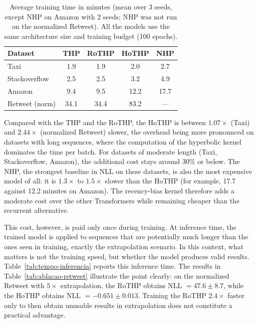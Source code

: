 \begin{table}[h!]
\centering
\caption{Average training time in minutes (mean over 3 seeds, except NHP on Amazon with 2 seeds; NHP was not run on the normalized Retweet). All the models use the same architecture size and training budget (100 epochs).}
\label{tab:tempo-treino}
\begin{tabular}{lcccc}
\toprule
Dataset & THP & RoTHP & HoTHP & NHP \\
\midrule
Taxi           &  1.9 &  1.9 &  2.0 &  2.7 \\
Stackoverflow  &  2.5 &  2.5 &  3.2 &  4.9 \\
Amazon         &  9.4 &  9.5 & 12.2 & 17.7 \\
Retweet (norm) & 34.1 & 34.4 & 83.2 & --- \\
\bottomrule
\end{tabular}
\end{table}

Compared with the THP and the RoTHP, the HoTHP is between $1.07\times$ (Taxi) and $2.44\times$ (normalized Retweet) slower, the overhead being more pronounced on datasets with long sequences, where the computation of the hyperbolic kernel dominates the time per batch. For datasets of moderate length (Taxi, Stackoverflow, Amazon), the additional cost stays around $30\%$ or below. The NHP, the strongest baseline in NLL on these datasets, is also the most expensive model of all: it is $1.3\times$ to $1.5\times$ slower than the HoTHP (for example, 17.7 against 12.2 minutes on Amazon). The recency-bias kernel therefore adds a moderate cost over the other Transformers while remaining cheaper than the recurrent alternative.

This cost, however, is paid only once during training. At inference time, the trained model is applied to sequences that are potentially much longer than the ones seen in training, exactly the extrapolation scenario. In this context, what matters is not the training speed, but whether the model produces valid results. Table~\ref{tab:tempo-inferencia} reports this inference time. The results in Table~\ref{tab:ablacao-retweet} illustrate the point clearly: on the normalized Retweet with $5\times$ extrapolation, the RoTHP obtains NLL $= 47.6 \pm 8.7$, while the HoTHP obtains NLL $= -0.651 \pm 0.013$. Training the RoTHP $2.4\times$ faster only to then obtain unusable results in extrapolation does not constitute a practical advantage.

